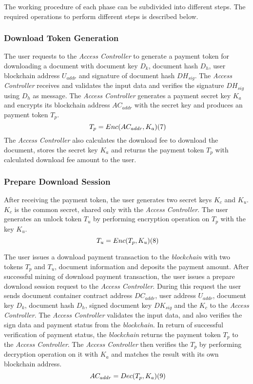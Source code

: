 \documentclass[conference]{IEEEtran}
\begin{document}
The working procedure of each phase can be subdivided into different steps. The required operations to perform different steps is described below. 

\subsubsection{Download Token Generation}
The user requests to the {\it Access Controller} to generate a payment token for downloading a document with document key $D_k$, document hash $D_h$, user blockchain address $U_{addr}$ and signature of document hash $DH_{sig}$. The {\it Access Controller} receives and validates the input data and verifies the signature $DH_{sig}$ using $D_{h}$ as message. The {\it Access Controller} generates a payment secret key $K_a$ and encrypts its blockchain address $AC_{addr}$ with the secret key and produces an payment token $T_{p}$. 
$$
{\ T_p = Enc (AC_{addr}, K_a)}  \relax{(7)}
$$
The {\it Access Controller} also calculates the download fee to download the document, stores the secret key $K_a$ and returns the payment token $T_p$ with calculated download fee amount to the user.

\subsubsection{Prepare Download Session}
After receiving the payment token, the user generates two secret keys $K_c$ and $K_u$. $K_c$ is the common secret, shared only with the {\it Access Controller}. The user generates an unlock token $T_u$ by performing encryption operation on $T_p$ with the key $K_u$.
$$
{\ T_u = Enc (T_p, K_u)}  \relax{(8)}
$$

The user issues a download payment transaction to the {\it blockchain} with two tokens $T_p$ and $T_u$, document information and deposits the payment amount.
After successful mining of download payment transaction, the user issues a prepare download session request to the {\it Access Controller}. During this request the user sends document container contract address $DC_{addr}$, user address $U_{addr}$, document key $D_k$, document hash $D_h$, signed document key $DK_{sig}$ and the $K_c$ to the {\it Access Controller}. The {\it Access Controller} validates the input data, and also verifies the sign data and payment status from the {\it blockchain}. In return of successful verification of payment status, the {\it blockchain} returns the payment token $T_p$ to the {\it Access Controller}. The {\it Access Controller} then verifies the $T_p$ by performing decryption operation on it with $K_a$ and matches the result with its own blockchain address. 
$$
{\ AC_{addr} = Dec (T_p, K_a)}  \relax{(9)}
$$
\end{document}
